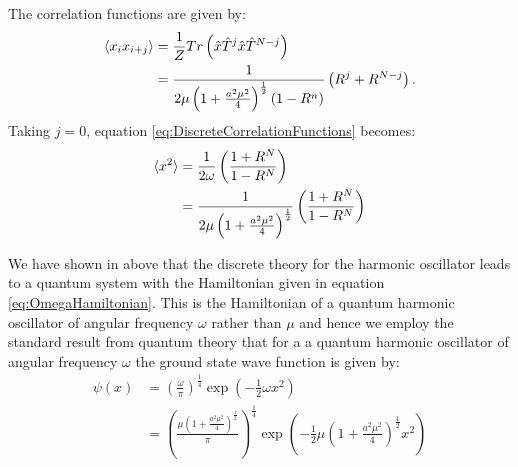 \documentclass[12pt]{article}
\begin{document}
        The correlation functions are given by:
        \begin{align}
            \label{eq:DiscreteCorrelationFunctions}
            \braket{x_ix_{i+j}} & = \frac{1}{Z}Tr\left(\hat{x}\hat{T}^j\hat{x}\hat{T}^{N-j}\right) \\
                                & = \frac{1}{2\mu\left(1+\frac{a^2\mu^2}{4}\right)^\frac{1}{2}\left(1-R^{n}\right)}\left(R^{j}+R^{N-j}\right).
        \end{align}
        Taking $j=0$, equation \ref{eq:DiscreteCorrelationFunctions} becomes:
        \begin{align}
            \label{eq:XSquaredExpectation2} \braket{x^2} & = \frac{1}{2\omega}\left(\frac{1+R^N}{1-R^N}\right) \\
            \label{eq:XSquaredExpectation23} & = \frac{1}{2\mu\left(1+\frac{a^2\mu^2}{4}\right)^{\frac{1}{2}}}\left(\frac{1+R^N}{1-R^N}\right)
        \end{align}

        We have shown in above that the discrete theory for the harmonic oscillator leads to a quantum system with the Hamiltonian given in equation \ref{eq:OmegaHamiltonian}. This is the Hamiltonian of a quantum harmonic oscillator of angular frequency $\omega$ rather than $\mu$ and hence we employ the standard result from quantum theory that for a a quantum harmonic oscillator of angular frequency $\omega$ the ground state wave function is given by: 
        \begin{align}
            \label{eq:DiscreteGroundStateWaveFunction2}
            \psi(x) & = \left(\frac{\omega}{\pi}\right)^\frac{1}{4}\exp\left(-\frac{1}{2}\omega x^2\right) \\
                    & = \left(\frac{\mu\left(1+\frac{a^2\mu^2}{4}\right)^\frac{1}{2}}{\pi}\right)^\frac{1}{4}\exp\left(-\frac{1}{2}\mu\left(1+\frac{a^2\mu^2}{4}\right)^\frac{1}{2} x^2\right)
        \end{align}
\end{document}
